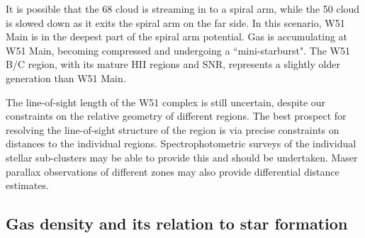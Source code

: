 It is possible that the 68 \kms cloud is streaming in to a spiral arm, while
the 50 \kms cloud is slowed down as it exits the spiral arm on the far side.
In this scenario, W51 Main is in the deepest part of the spiral arm potential.
Gas is accumulating at W51 Main,  becoming compressed and undergoing a
``mini-starburst".  The W51 B/C region, with its mature HII
regions and SNR, represents a slightly older generation than W51 Main.




The line-of-sight length of the W51 complex is still uncertain, despite our
constraints on the relative geometry of different regions.  The best prospect
for resolving the line-of-sight structure of the region is via precise
constraints on distances to the individual regions.  Spectrophotometric surveys
of the individual stellar sub-clusters may be able to provide this and should
be undertaken.  Maser parallax observations of different zones may also provide
differential distance estimates.

\subsection{Gas density and its relation to star formation}
%

